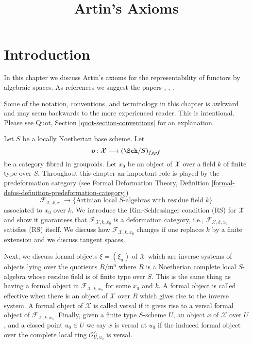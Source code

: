 

%


\title{Artin's Axioms}

\maketitle

\label{section-phantom}

\tableofcontents




\section{Introduction}
\label{section-introduction}

\noindent
In this chapter we discuss Artin's axioms for the representability of
functors by algebraic spaces. As references we suggest the papers
\cite{ArtinI}, \cite{ArtinII}, \cite{ArtinVersal}.

\medskip\noindent
Some of the notation, conventions, and terminology in this chapter is awkward
and may seem backwards to the more experienced reader. This is intentional.
Please see Quot, Section \ref{quot-section-conventions} for an
explanation.

\medskip\noindent
Let $S$ be a locally Noetherian base scheme. Let
$$
p : \mathcal{X} \longrightarrow (\Sch/S)_{fppf}
$$
be a category fibred in groupoids. Let $x_0$ be an object of $\mathcal{X}$
over a field $k$ of finite type over $S$. Throughout this chapter an important
role is played by the predeformation category
(see Formal Deformation Theory,
Definition \ref{formal-defos-definition-predeformation-category})
$$
\mathcal{F}_{\mathcal{X}, k, x_0}
\longrightarrow
\{\text{Artinian local }S\text{-algebras with residue field }k\}
$$
associated to $x_0$ over $k$. We introduce the Rim-Schlessinger condition (RS)
for $\mathcal{X}$ and show it guarantees that
$\mathcal{F}_{\mathcal{X}, k, x_0}$ is a deformation category, i.e.,
$\mathcal{F}_{\mathcal{X}, k, x_0}$ satisfies (RS) itself.
We discuss how $\mathcal{F}_{\mathcal{X}, k, x_0}$
changes if one replaces $k$ by a finite extension
and we discuss tangent spaces.

\medskip\noindent
Next, we discuss formal objects $\xi = (\xi_n)$ of $\mathcal{X}$ which are
inverse systems of objects lying over the quotients $R/\mathfrak m^n$
where $R$ is a Noetherian complete local $S$-algebra whose residue field
is of finite type over $S$. This is the same thing as having a formal
object in $\mathcal{F}_{\mathcal{X}, k, x_0}$ for some $x_0$ and $k$.
A formal object is called effective when there is an object of
$\mathcal{X}$ over $R$ which gives rise to the inverse system.
A formal object of $\mathcal{X}$ is called versal if it gives rise to a
versal formal object of $\mathcal{F}_{\mathcal{X}, k, x_0}$.
Finally, given a finite type $S$-scheme $U$, an object $x$
of $\mathcal{X}$ over $U$, and a closed point $u_0 \in U$ we say
$x$ is versal at $u_0$ if the induced formal object over the complete
local ring $\mathcal{O}_{U, u_0}^\wedge$ is versal.


